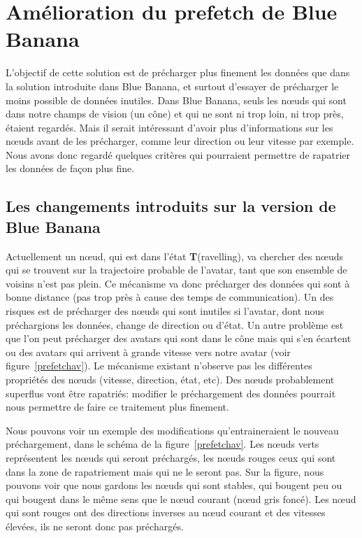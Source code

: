 \section{Amélioration du prefetch de Blue Banana}

L'objectif de cette solution est de précharger plus finement les données que dans la solution introduite dans Blue Banana, et surtout d'essayer de précharger le moins possible de données inutiles. Dans Blue Banana, seuls les nœuds qui sont dans notre champs de vision (un cône) et qui ne sont ni trop loin, ni trop près, étaient regardés. Mais il serait intéressant d'avoir plus d'informations sur les nœuds avant de les précharger, comme leur direction ou leur vitesse par exemple. Nous avons donc regardé quelques critères qui pourraient permettre de rapatrier les données de façon plus fine.

\subsection{Les changements introduits sur la version de Blue Banana}


\par Actuellement un nœud, qui est dans l'état \textbf{T}(ravelling), va chercher des nœuds qui se trouvent sur la trajectoire probable de l'avatar, tant que son ensemble de voisins n'est pas plein. Ce mécanisme va donc précharger des données qui sont à bonne distance (pas trop près à cause des temps de communication). Un des risques est de précharger des nœuds qui sont inutiles si l'avatar, dont nous préchargions les données, change de direction ou d'état. Un autre problème est que l'on peut précharger des avatars qui sont dans le cône mais qui s'en écartent ou des avatars qui arrivent à grande vitesse vers notre avatar (voir figure~\ref{prefetchav}). Le mécanisme existant n'observe pas les différentes propriétés des nœuds (vitesse, direction, état, etc). Des nœuds probablement superflus vont être rapatriés: modifier le préchargement des données pourrait nous permettre de faire ce traitement plus finement.

\par  Nous pouvons voir un exemple des modifications qu'entraineraient le nouveau préchargement, dans le schéma de la figure~\ref{prefetchav}. Les nœuds verts représentent les nœuds qui seront préchargés, les nœuds rouges ceux qui sont dans la zone de rapatriement mais qui ne le seront pas. Sur la figure, nous pouvons voir que nous gardons les nœuds qui sont stables, qui bougent peu ou qui bougent dans le même sens que le nœud courant (nœud gris foncé). Les nœud qui sont rouges ont des directions inverses au nœud courant et des vitesses élevées, ils ne seront donc pas préchargés.

